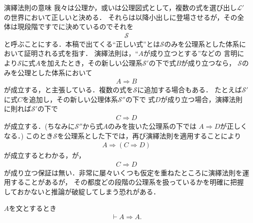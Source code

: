 	
	\begin{itembox}[l]{演繹法則の意味}
		我々は公理か，或いは公理図式として，複数の式を選び出し$\mathcal{L}'$の世界において正しいと決める．
		それらは以降小出しに登場させるが，その全体は現段階ですでに決めているのでそれを
		\begin{align}
			\mathscr{S}
		\end{align}
		と呼ぶことにする．本稿で出てくる``正しい式''とは$\mathscr{S}$のみを公理系とした体系において証明される式を指す．
		演繹法則は，``$A$が成り立つとする''などの
		言明により$\mathscr{S}$に式$A$を加えたとき，その新しい公理系$\mathscr{S}'$の下で式$B$が成り立つなら，
		$\mathscr{S}$のみを公理とした体系において
		\begin{align}
			A \Longrightarrow B
		\end{align}
		が成立する，と主張している．複数の式を$\mathscr{S}$に追加する場合もある．
		たとえば$\mathscr{S}'$に式$C$を追加し，その新しい公理体系$\mathscr{S}''$の下で
		式$D$が成り立つ場合，演繹法則に則れば$\mathscr{S}'$の下で
		\begin{align}
			C \Longrightarrow D
		\end{align}
		が成立する．(ちなみに$\mathscr{S}''$から式$A$のみを抜いた公理系の下では
		$A \Longrightarrow D$が正しくなる．)
		このとき$\mathscr{S}$を公理系とした下では，再び演繹法則を適用することにより
		\begin{align}
			A \Longrightarrow (C \Longrightarrow D)
		\end{align}
		が成立するとわかる，が，
		\begin{align}
			C \Longrightarrow D
		\end{align}
		が成り立つ保証は無い．非常に屡々いくつも仮定を重ねたところに演繹法則を運用することがあるが，
		その都度どの段階の公理系を扱っているかを明確に把握しておかないと推論が破綻してしまう恐れがある．
	\end{itembox}
	
	\begin{screen}
		\begin{logicalthm}[含意の反射律]\label{logicalthm:reflective_law_of_implication}
			$A$を文とするとき
			\begin{align}
				\vdash A \Longrightarrow A.
			\end{align}
		\end{logicalthm}
	\end{screen}
	
